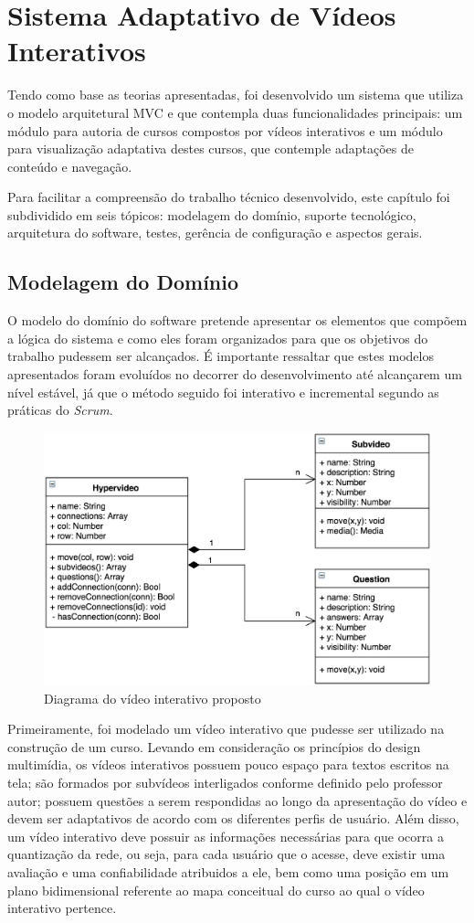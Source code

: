 \chapter[Sistema Adaptativo de Vídeos Interativos]{Sistema Adaptativo de Vídeos Interativos}

Tendo como base as teorias apresentadas, foi desenvolvido um sistema que utiliza o modelo arquitetural MVC e que contempla duas funcionalidades principais: um módulo para autoria de cursos compostos por vídeos interativos e um módulo para visualização adaptativa destes cursos, que contemple adaptações de conteúdo e navegação. 

Para facilitar a compreensão do trabalho técnico desenvolvido, este capítulo foi subdividido em seis tópicos: modelagem do domínio, suporte tecnológico, arquitetura do software, testes, gerência de configuração e aspectos gerais.

\section{Modelagem do Domínio}

O modelo do domínio do software pretende apresentar os elementos que compõem a lógica do sistema e como eles foram organizados para que os objetivos do trabalho pudessem ser alcançados. É importante ressaltar que estes modelos apresentados foram evoluídos no decorrer do desenvolvimento até alcançarem um nível estável, já que o método seguido foi interativo e incremental segundo as práticas do \textit{Scrum}.

\begin{figure}[h!]
	\centering
  	\includegraphics[width=.6\linewidth]{figuras/video.eps}
  	\caption{Diagrama do vídeo interativo proposto}
  	\label{fig:video}
\end{figure}

Primeiramente, foi modelado um vídeo interativo que pudesse ser utilizado na construção de um curso. Levando em consideração os princípios do design multimídia, os vídeos interativos possuem pouco espaço para textos escritos na tela; são formados por subvídeos interligados conforme definido pelo professor autor; possuem questões a serem respondidas ao longo da apresentação do vídeo e devem ser adaptativos de acordo com os diferentes perfis de usuário. Além disso, um vídeo interativo deve possuir as informações necessárias para que ocorra a quantização da rede, ou seja, para cada usuário que o acesse, deve existir uma avaliação e uma confiabilidade atribuidos a ele, bem como uma posição em um plano bidimensional referente ao mapa conceitual do curso ao qual o vídeo interativo pertence. 

